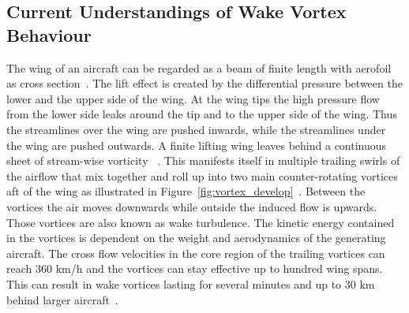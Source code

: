 
%



\subsection{Current Understandings of Wake Vortex Behaviour}
The wing of an aircraft can be regarded as a beam of finite length with aerofoil as cross section~\cite{hansen2015aerodynamics}.
The lift effect is created by the differential pressure between the lower and the upper side of the wing. At the wing tips the high pressure flow from the lower side leaks around the tip and to the upper side of the wing. Thus the streamlines over the wing are pushed inwards, while the streamlines under the wing are pushed outwards. A finite lifting wing leaves behind a continuous sheet of stream-wise vorticity ~\cite{hansen2015aerodynamics}.  This manifests itself in multiple trailing swirls of the airflow that mix together and roll up into two main counter-rotating vortices aft of the wing as illustrated in Figure~\ref{fig:vortex_develop}~\cite{magazine_aibus_safety, Breitsamter2011Feb, gerz_commercial_2002}. Between the vortices the air moves downwards while outside the induced flow is upwards. Those vortices are also known as wake turbulence. 
The kinetic energy contained in the vortices is dependent on the weight and aerodynamics of the generating aircraft. The cross flow velocities in the core region of the trailing vortices can reach $360$ km/h and the vortices can stay effective up to hundred wing spans. This can result in wake vortices lasting for several minutes and up to $30$ km behind larger aircraft~\cite{Breitsamter2011Feb, gerz_commercial_2002}. 

